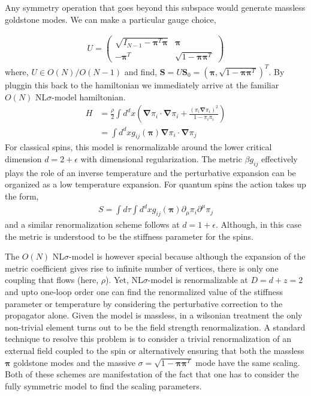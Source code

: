 \documentclass[notitlepage,onecolumn,showpacs,11pt]{revtex4-1}
\newcommand{\bsym}[1]{\boldsymbol{#1}}
\newcommand{\mbf}[1]{\mathbf{#1}}
\newcommand{\grad}{\boldsymbol{\nabla}}
\begin{document}
Any symmetry operation that goes beyond this subspace would generate massless 
goldstone modes. We can make a particular gauge choice,

\begin{equation}
    \begin{aligned}
        U =  \begin{pmatrix}
            \sqrt{I_{N-1}-\bsym{\pi}^T\bsym{\pi}} 
            & \bsym{\pi}\\
            -\bsym{\pi}^T
            & \sqrt{1-\bsym{\pi}\bsym{\pi}^T} 
        \end{pmatrix}
    \end{aligned}
\end{equation}
where, $U\in O(N)/O(N-1)$ and find, $\mbf{S}=U\mbf{S}_0=(\bsym{\pi},
\sqrt{1-\bsym{\pi}\bsym{\pi}^T})^T$. By pluggin this back to the hamiltonian
we immediately arrive at the familiar $O(N)$ NL$\sigma$-model hamiltonian.
\begin{equation}
    \begin{aligned}
        H &= \frac{\rho}{2}\int d^dx\left(\grad\pi_i\cdot\grad\pi_i
        +\frac{(\pi_i\grad\pi_i)^2}{1-\pi_i\pi_i}\right)\\
        &= \int d^dx g_{ij}(\bsym{\pi})\grad\pi_i\cdot\grad\pi_j
    \end{aligned}
\end{equation}
For classical spins, this model is renormalizable around the lower critical
dimension $d=2+\epsilon$ with dimensional regularization. The metric $\beta g_{ij}$ 
effectively plays the role of an inverse temperature and the perturbative
expansion can be organized as a low temperature expansion. For quantum spins
the action takes up the form,
\begin{equation}
    \begin{aligned}
        S = \int d\tau\int d^dx g_{ij}(\bsym{\pi})
        \partial_\mu\pi_i\partial^\mu\pi_j
    \end{aligned}
\end{equation}
and a similar renormalization scheme follows at $d=1+\epsilon$. Although, in this
case the metric is understood to be the stiffness parameter for the spins. 

The $O(N)$ NL$\sigma$-model is however special because although the expansion of the 
metric coefficient gives rise to infinite number of vertices, there is only one coupling 
that flows (here, $\rho$). Yet, NL$\sigma$-model is renormalizable at $D=d+z=2$ and upto
one-loop order one can find the renormalized value of the stiffness parameter or 
temperature by considering the perturbative correction to the propagator alone. Given
the model is massless, in a wilsonian treatment the only non-trivial element turns out 
to be the field strength renormalization. A standard technique to resolve this
problem is to consider a trivial renormalization of an external field coupled to the
spin or alternatively ensuring that both the massless $\bsym{\pi}$ goldstone modes and
the massive $\sigma=\sqrt{1-\bsym{\pi}\bsym{\pi}^T}$ mode have the same scaling. Both
of these schemes are manifestation of the fact that one has to consider the fully symmetric 
model to find the scaling parameters.
\end{document}
